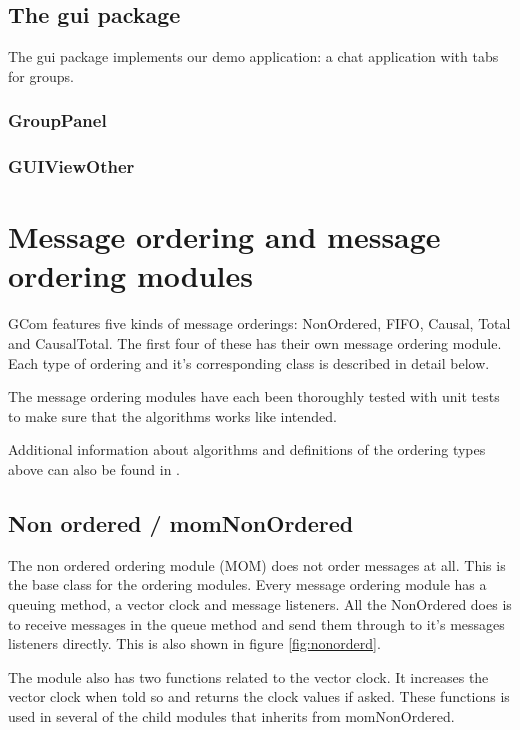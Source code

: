 \documentclass[english]{article}
\begin{document}
\subsection{The gui package}                                                                                    
The gui package implements our demo application: a chat application with tabs for groups. 

\subsubsection{GroupPanel}

\subsubsection{GUIViewOther}


\section{Message ordering and message ordering modules}
\label{messageordering}
GCom features five kinds of message orderings: NonOrdered, FIFO, Causal, Total and CausalTotal. The first four of these has their own message ordering module. Each type of ordering and it's corresponding class is described in detail below.

The message ordering modules have each been thoroughly tested with unit tests to make sure that the algorithms works like intended.

Additional information about algorithms and definitions of the ordering types above can also be found in \cite{distsys-ordering}.

\subsection{Non ordered / momNonOrdered}
The non ordered ordering module (MOM) does not order messages at all. This is the base class for the ordering modules. Every message ordering module has a queuing method, a vector clock and message listeners. All the NonOrdered does is to receive messages in the queue method and send them through to it's messages listeners directly. This is also shown in figure \vref{fig:nonorderd}.

The module also has two functions related to the vector clock. It increases the vector clock when told so and returns the clock values if asked. These functions is used in several of the child modules that inherits from momNonOrdered.
\end{document}
